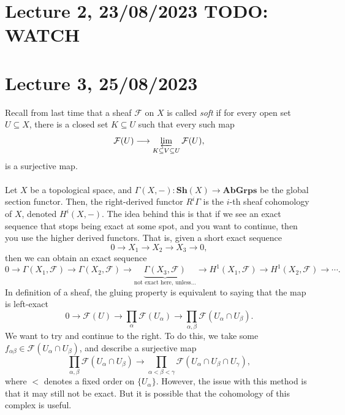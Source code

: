\documentclass[a4paper]{report}
\theoremstyle{definition}
\theoremstyle{remark}
\theoremstyle{proposition}
\theoremstyle{conjecture}
\theoremstyle{lemma}
\theoremstyle{corollary}
\theoremstyle{exercise}
\theoremstyle{example}
\newtheorem{example}{Example}
\newcommand{\mcal}{\mathcal}
\begin{document}

\section{Lecture 2, 23/08/2023 TODO: WATCH}

\section{Lecture 3, 25/08/2023}

Recall from last time that a sheaf $\mcal{F}$ on $X$ is called \emph{soft}
if for every open set $U\subseteq X$, there is a closed set $K\subseteq U$ 
such that every such map 
$$\mcal{F}(U) \longrightarrow \varprojlim_{K\subseteq V \subseteq U}\mcal{F}(U),$$
is a surjective map.\\\\
Let $X$ be a topological space, and $\Gamma(X,-) : \mathbf{Sh}(X) \to \mathbf{AbGrps}$ be the global section functor. 
Then, the right-derived functor $R^i\Gamma$ is the $i$-th sheaf 
cohomology of $X$, denoted $H^i(X,-)$. The idea behind this is that 
if we see an exact sequence that stops being exact at some spot, and you 
want to continue, then you use the higher derived functors.
That is, given a short exact sequence 
$$0\longrightarrow X_1 \longrightarrow X_2 \longrightarrow X_3 \longrightarrow 0,$$
then we can obtain an exact sequence 
$$0\longrightarrow \Gamma(X_1,\mcal{F}) \longrightarrow \Gamma(X_2,\mcal{F})\longrightarrow \underbrace{\Gamma(X_3,\mcal{F})}_{\text{not exact here, unless\ldots}} \longrightarrow H^1(X_1,\mcal{F}) \longrightarrow H^1(X_2,\mcal{F})\longrightarrow\cdots.$$
In definition of a sheaf, the gluing property is equivalent to saying that 
the map is left-exact
$$0\longrightarrow \mcal{F}(U) \longrightarrow \prod_\alpha \mcal{F}(U_\alpha)\longrightarrow \prod_{\alpha,\beta}\mcal{F}(U_\alpha\cap U_\beta).$$
We want to try and continue to the right. 
To do this, we take some $f_{\alpha\beta} \in \mcal{F}(U_\alpha\cap U_\beta)$, and describe 
a surjective map 
$$\prod_{\alpha,\beta} \mcal{F}(U_\alpha\cap U_\beta) \longrightarrow \prod_{\alpha<\beta<\gamma}\mcal{F}(U_\alpha \cap U_\beta \cap U_\gamma),$$
where $<$ denotes a fixed order on $\lbrace U_\alpha\rbrace$.
However, the issue with this method is that it may still not be exact. 
But it is possible that the cohomology of this complex is useful.
\end{document}

